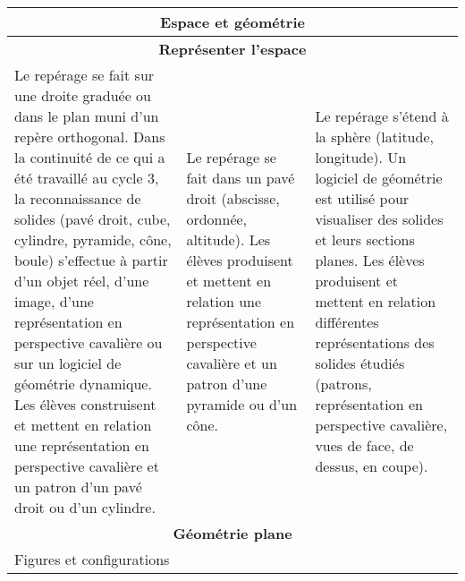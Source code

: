 \documentclass[11pt]{article}
\newcommand{\categorie}[1]{\hline\multicolumn{3}{|c|}{\color{white}\LARGE\cellcolor{bleu}\sffamily\phantom{É} #1 \phantom{É}}\rmfamily \\\hline}
\newcommand{\souscategorie}[1]{\hline\multicolumn{3}{|c|}{\color{bleu}\Large\bf\rmfamily\phantom{É}#1\phantom{É}\rmfamily}\\\hline}
\newcommand{\note}[1]{\hline\multicolumn{3}{|p{18.6cm}|}{#1} \\ \hline}
\newenvironment{programme}
{
    \setlength{\arrayrulewidth}{0.5pt}
    \arrayrulecolor{bleu}
    \begin{center}
    \begin{tabular}{|p{6.4cm}|p{6.4cm}|p{6.4cm}|}
}
{
    \hline
    \end{tabular}
    \end{center}
}
\begin{document}
\begin{programme}
    \categorie{Espace et géométrie} 
    \souscategorie{Représenter l’espace} 
    Le repérage se fait sur une droite graduée ou dans le plan muni d’un repère orthogonal. Dans la continuité de ce qui a été travaillé au cycle 3, la reconnaissance de solides (pavé droit, cube, cylindre, pyramide, cône, boule) s’effectue à partir d’un objet réel, d’une image, d’une représentation en perspective cavalière ou sur un logiciel de géométrie dynamique. Les élèves construisent et mettent en relation une représentation en perspective cavalière et un patron d’un pavé droit ou d’un cylindre. & Le repérage se fait dans un pavé droit (abscisse, ordonnée, altitude). Les élèves produisent et mettent en relation une représentation en perspective cavalière et un patron d’une pyramide ou d’un cône. & Le repérage s’étend à la sphère (latitude, longitude). Un logiciel de géométrie est utilisé pour visualiser des solides et leurs sections planes. Les élèves produisent et mettent en relation différentes représentations des solides étudiés (patrons, représentation en perspective cavalière, vues de face, de dessus, en coupe). \\
    \souscategorie{Géométrie plane}
    \note{Figures et configurations} 

\end{programme}
\end{document}
